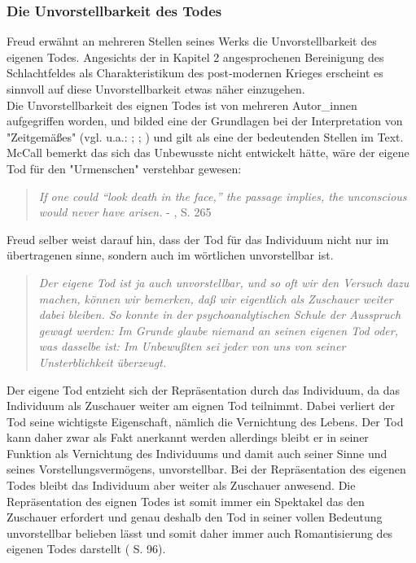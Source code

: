 \documentclass[11pt,a4paper,oneside,numbers=noenddot,bibliography=totocnumbered,DIV=13]{scrartcl}
\begin{document}
{\subsubsection{Die Unvorstellbarkeit des Todes}
Freud erwähnt an mehreren Stellen seines Werks die Unvorstellbarkeit des eigenen Todes. Angesichts der in Kapitel 2 angesprochenen Bereinigung des Schlachtfeldes als Charakteristikum des post-modernen Krieges erscheint es sinnvoll auf diese Unvorstellbarkeit etwas näher einzugehen. \\
Die Unvorstellbarkeit des eignen Todes ist von mehreren Autor\_innen aufgegriffen worden, und bilded eine der Grundlagen bei der Interpretation von "Zeitgemäßes" (vgl. u.a.: \cite{liran_razinsky_how_2009}; \cite{mccall_society--gang_2006}; \cite{stonebridge_what_2009} ) und gilt als eine der bedeutenden Stellen im Text. McCall bemerkt das sich das Unbewusste nicht entwickelt hätte, wäre der eigene Tod für den "Urmenschen" verstehbar gewesen:
\begin{quote}
\textit{If one could “look death in the face,” the passage implies, the unconscious would
 never have arisen.} -  \cite{mccall_society--gang_2006}, S. 265
 \end{quote}
 Freud selber weist darauf hin, dass der Tod für das Individuum nicht nur im übertragenen sinne, sondern auch im wörtlichen unvorstellbar ist. 
 \begin{quote}
 \textit{Der eigene Tod ist ja auch unvorstellbar, und so oft wir den Versuch dazu machen, können wir bemerken, daß wir eigentlich als Zuschauer weiter dabei bleiben. So konnte in der psychoanalytischen Schule der Ausspruch gewagt werden: Im Grunde glaube niemand an seinen eigenen Tod oder, was dasselbe ist: Im Unbewußten sei jeder von uns von seiner Unsterblichkeit überzeugt.} 
 \end{quote}
 Der eigene Tod entzieht sich der Repräsentation durch das Individuum, da das Individuum als Zuschauer weiter am eignen Tod teilnimmt. Dabei verliert der Tod seine wichtigste Eigenschaft, nämlich die Vernichtung des Lebens. Der Tod kann daher zwar als Fakt anerkannt werden allerdings bleibt er in seiner Funktion als Vernichtung des Individuums und damit auch seiner Sinne und seines Vorstellungsvermögens, unvorstellbar. Bei der Repräsentation des eigenen Todes bleibt das Individuum aber weiter als Zuschauer anwesend. Die Repräsentation des eignen Todes ist somit immer ein Spektakel das den Zuschauer erfordert und genau deshalb den Tod in seiner vollen Bedeutung unvorstellbar belieben lässt und somit daher immer auch Romantisierung des eigenen Todes darstellt (\cite{weber_wartime_1997} S. 96).\\
}
\end{document}
